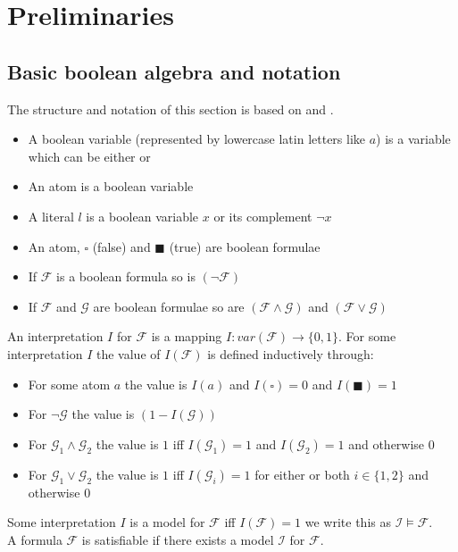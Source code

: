 \chapter{Preliminaries}
\section{Basic boolean algebra and notation}
The structure and notation of this section is based on \cite{Marques-Silva-PropositionalSATSolving} and \cite{fondements-logique}.
\begin{definition}

\begin{itemize}
    \item A boolean variable (represented by lowercase latin letters like $a$) is a variable which can be either \true or \false
    \item An atom is a boolean variable
    \item A literal $l$ is a boolean variable $x$ or its complement $\neg x$
\end{itemize}

\end{definition}
\begin{definition}
\begin{itemize}
    \item An atom, $\square$ (false) and $\blacksquare$ (true)  are boolean formulae
    \item If $\mathcal{F}$ is a boolean formula so is $\left(\neg\mathcal{F}\right)$
    \item If $\mathcal{F}$ and $\mathcal{G}$ are boolean formulae so are $\left(\mathcal{F} \land \mathcal{G}\right)$ and $\left(\mathcal{F} \lor \mathcal{G}\right)$
\end{itemize}
\end{definition}
\begin{definition}
An interpretation $I$ for $\mathcal{F}$ is a mapping $I\colon var(\mathcal{F}) \to \{0,1\}$.
For some interpretation $I$ the value of $I(\mathcal{F})$ is defined inductively through:
\begin{itemize}
    \item For some atom $a$ the value is $I(a)$ and $I\left(\square\right)=0$ and $I\left(\blacksquare\right)=1$
    \item For $\neg\mathcal{G}$ the value is $\left(1-I(\mathcal{G})\right)$
    \item For $\mathcal{G}_1 \land \mathcal{G}_2$ the value is $1$ iff $I(\mathcal{G}_1)=1$ and $I(\mathcal{G}_2)=1$  and otherwise $0$
    \item For $\mathcal{G}_1 \lor \mathcal{G}_2$ the value is $1$ iff $I(\mathcal{G}_i)=1$ for either or both $i\in\{1,2\}$ and otherwise $0$
\end{itemize}

Some interpretation $I$ is a model for $\mathcal{F}$ iff $I(\mathcal{F})=1$ we write this as $\mathcal{I}\vDash\mathcal{F}$.\\
A formula $\mathcal{F}$ is satisfiable if there exists a model $\mathcal{I}$ for $\mathcal{F}$.
\end{definition}

